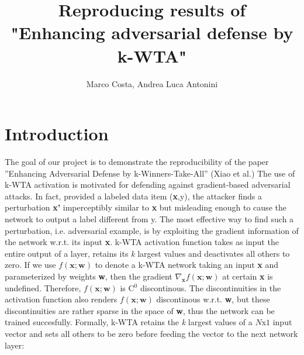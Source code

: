\documentclass[a4paper]{article}
\title{Reproducing results of \\
	"Enhancing adversarial defense by k-WTA"}
\author{Marco Costa, Andrea Luca Antonini}
\begin{document}
	
	\maketitle
	
	\section{Introduction}
	The goal of our project is to demonstrate the reproducibility of the paper ”Enhancing Adversarial Defense by k-Winners-Take-All” (Xiao et al.) \newline
	The use of k-WTA activation is motivated for defending against gradient-based adversarial attacks. In fact, provided a labeled data item (\textbf{x},y), the attacker finds a perturbation \textbf{x'} imperceptibly similar to \textbf{x} but misleading enough to cause the network to output a label different from y. The most effective way to find such a perturbation, i.e. adversarial example, is by exploiting the gradient information of the network w.r.t. its input \textbf{x}. \newline
	k-WTA activation function takes as input the entire output of a layer, retains its \textit{k} largest values and deactivates all others to zero. If we use $f(\textbf{x};\textbf{w})$ to denote a k-WTA network taking an input \textbf{x} and parameterized by weights \textbf{w}, then the gradient $\nabla_{\textbf{x}}f(\textbf{x};\textbf{w})$ at certain \textbf{x} is undefined. Therefore, $f(\textbf{x};\textbf{w})$ is C$^0$ discontinous. The discontinuities in the activation function also renders $f(\textbf{x};\textbf{w})$ discontinous w.r.t. \textbf{w}, but these discontinuities are rather sparse in the space of \textbf{w}, thus the network can be trained succesfully. \newline
	Formally, k-WTA retains the \textit{k} largest values of a $N$x$1$ input vector and sets all others to be zero before feeding the vector to the next network layer:
	
\end{document}
